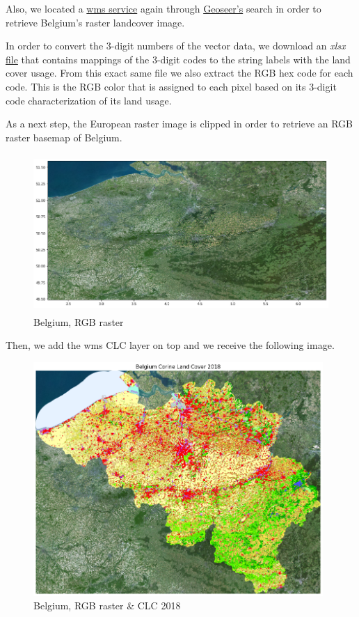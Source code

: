 Also, we located a \href{https://wms.ngi.be/inspire23/landcover/ows?SERVICE=WMS&}{wms service} again through \href{https://www.geoseer.net/}{Geoseer's} search in order to retrieve Belgium's raster landcover image.

In order to convert the 3-digit numbers of the vector data, we download an \emph{xlsx} \href{https://www.eea.europa.eu/data-and-maps/data/corine-land-cover-2000-clc2000-100-m-version-9-2007/corine-land-cover-2000-classes-and-rgb-color-codes/clc2000legend.xls}{file} that contains mappings of the 3-digit codes to the string labels with the land cover usage. From this exact same file we also extract the RGB hex code for each code. This is the RGB color that is assigned to each pixel based on its 3-digit code characterization of its land usage.

As a next step, the European raster image is clipped in order to retrieve an RGB raster basemap of Belgium.

\begin{figure}[h]
    \centering
    \includegraphics[height=6cm]{figures/q3_3_belgium_map.png}
    \caption{Belgium, RGB raster}
    \label{fig:Belgium, RGB raster}
\end{figure}
\FloatBarrier %

Then, we add the wms CLC layer on top and we receive the following image.

\begin{figure}[h]
    \centering
    \includegraphics[width=11cm]{figures/q3_3_belgium_map_and_clc2018.png}
    \caption{Belgium, RGB raster & CLC 2018}
    \label{fig:Belgium, RGB raster & CLC 2018}
\end{figure}
\FloatBarrier %

